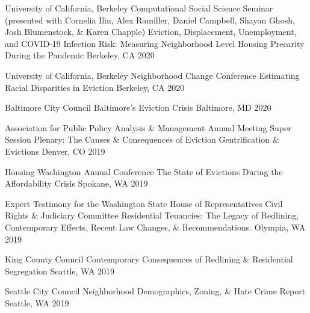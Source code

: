 \begin{cventries}
  \cventry
    {University of California, Berkeley Computational Social Science Seminar (presented with Cornelia Ilin, Alex Ramiller, Daniel Campbell, Shayan Ghosh, Josh Blumenstock, \& Karen Chapple)} %
    {Eviction, Displacement, Unemployment, and COVID-19 Infection Risk: Measuring Neighborhood Level Housing Precarity During the Pandemic} %
    {Berkeley, CA} %
    {2020} %
    {}

  \cventry
    {University of California, Berkeley Neighborhood Change Conference} %
    {Estimating Racial Disparities in Eviction} %
    {Berkeley, CA} %
    {2020} %
    {}

  \cventry
    {Baltimore City Council} %
    {Baltimore's Eviction Crisis} %
    {Baltimore, MD} %
    {2020} %
    {}

  \cventry
    {Association for Public Policy Analysis \& Management Annual Meeting Super Session Plenary: The Causes \& Consequences of Eviction} %
    {Gentrification \& Evictions} %
    {Denver, CO} %
    {2019} %
    {}

  \cventry
    {Housing Washington Annual Conference} %
    {The State of Evictions During the Affordability Crisis} %
    {Spokane, WA} %
    {2019} %
    {}

  \cventry
    {Expert Testimony for the Washington State House of Representatives Civil Rights \& Judiciary Committee} %
    {Residential Tenancies: The Legacy of Redlining, Contemporary Effects, Recent Law Changes, \& Recommendations.} %
    {Olympia, WA} %
    {2019} %
    {}

  \cventry
    {King County Council} %
    {Contemporary Consequences of Redlining \& Residential Segregation} %
    {Seattle, WA} %
    {2019} %
    {}

  \cventry
    {Seattle City Council} %
    {Neighborhood Demographics, Zoning, \& Hate Crime Report} %
    {Seattle, WA} %
    {2019} %
    {}


\end{cventries}
